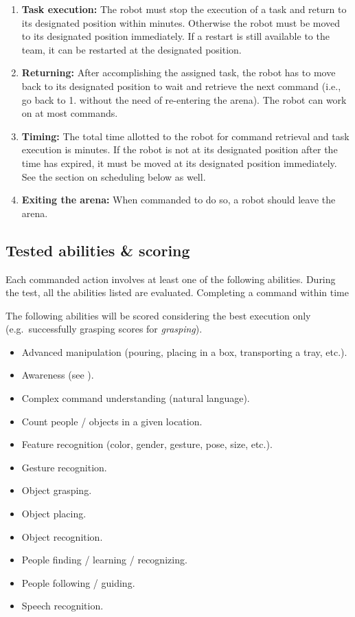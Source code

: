 \begin{enumerate}
	\item \textbf{Task execution:} The robot must stop the execution of a task and return to its designated position within \eegpsrMaxCmdTime minutes. Otherwise the robot must be moved to its designated position immediately. If a restart is still available to the team, it can be restarted at the designated position. \\

	\item \textbf{Returning:} After accomplishing the assigned task, the robot has to move back to its designated position to wait and retrieve the next command (i.e., go back to 1. without the need of re-entering the arena). The robot can work on at most \eegpsrMaxCmd commands. \\

	\item \textbf{Timing:} The total time allotted to the robot for command retrieval and task execution is \eegpsrMaxTeamTime minutes. If the robot is not at its designated position after the time has expired, it must be moved at its designated position immediately. See the section on scheduling below as well.\\

	\item \textbf{Exiting the arena:} When commanded to do so, a robot should leave the arena. \\

\end{enumerate}

\subsection{Tested abilities \& scoring}
\label{sec:eegpsr-abilities}
Each commanded action involves at least one of the following abilities. During the test, all the abilities listed are evaluated. Completing a command within time 

The following abilities will be scored considering the best execution only (e.g.~successfully grasping scores for \textit{grasping}).

\begin{itemize}
	\item Advanced manipulation (pouring, placing in a box, transporting a tray, etc.).
	\item Awareness (see ).
	\item Complex command understanding (natural language).
	\item Count people / objects in a given location.
	\item Feature recognition (color, gender, gesture, pose, size, etc.).
	\item Gesture recognition.
	\item Object grasping.
	\item Object placing.
	\item Object recognition.
	\item People finding / learning / recognizing.
	\item People following / guiding.
	\item Speech recognition.
\end{itemize}

